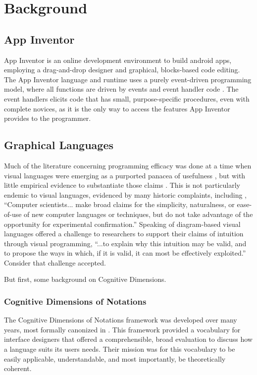 \chapter{Background}
\label{chap:background}

\section{App Inventor}
\label{sec:app-inventor-background}
App Inventor is an online development environment to build android apps, employing a drag-and-drop designer and graphical, blocks-based code editing. The App Inventor language and runtime uses a purely event-driven programming model, where all functions are driven by events and event handler code \citep{turbak-2014}. The event handlers elicits code that has small, purpose-specific procedures, even with complete novices, as it is the only way to access the features App Inventor provides to the programmer.



\section{Graphical Languages}
\label{sec:graphical-languages}

Much of the literature concerning programming efficacy was done at a time when visual languages were emerging as a purported panacea of usefulness \citep{shu-1988}, but with little empirical evidence to substantiate those claims \citep{petre-1995}. This is not particularly endemic to visual languages, evidenced by many historic complaints, including \citet{sch-1980}, ``Computer scientists... make broad claims for the simplicity, naturalness, or ease-of-use of new computer languages or techniques, but do not take advantage of the opportunity for experimental confirmation.'' Speaking of diagram-based visual languages \citet{blackwell-2001} offered a challenge to researchers to support their claims of intuition through visual programming, ``...to explain why this intuition may be valid, and to propose the ways in which, if it is valid, it can most be effectively exploited.'' Consider that challenge accepted.

But first, some background on Cognitive Dimensions.


\subsection{Cognitive Dimensions of Notations}
The Cognitive Dimensions of Notations framework was developed over many years, most formally canonized in \citet{blackwell-2003}. This framework provided a vocabulary for interface designers that offered a comprehensible, broad evaluation to discuss how a language suits its users needs. Their mission was for this vocabulary to be easily applicable, understandable, and most importantly, be theoretically coherent. 

